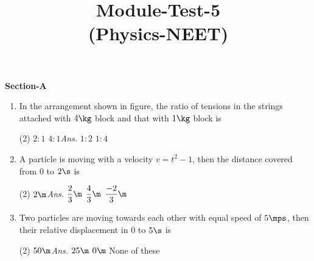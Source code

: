 \documentclass{article}
\title{Module-Test-5\\(Physics-NEET)}
\newcommand{\ans}{\textcolor{red!95}{\textit{\quad Ans.}}}
\begin{document}
\maketitle



\begin{center}
\textbf{Section-A}
\end{center}


\begin{enumerate}

\item In the arrangement shown in figure, the ratio of tensions in the strings attached with $4 \kg$ block and that with $1 \kg$ block is
\begin{center}
\end{center} 
\begin{tasks}(2)
	\task $2:1$
	\task $4:1$\ans
	\task $1:2$
	\task $1:4$
\end{tasks}

	\item A particle is moving with a velocity $v=t^2-1$, then the distance covered from $0$ to $2\s$ is
	\begin{center}
	\end{center}
	\begin{tasks}(2)
		\task $2\m$\ans
		\task $\dfrac{2}{3}\m$
		\task $\dfrac{4}{3}\m$
		\task $\dfrac{-2}{3}\m$
	\end{tasks}
	
	\item Two particles are moving towards each other with equal speed of $5\mps$, then their relative displacement in $0$ to $5\s$ is
	\begin{tasks}(2)
		\task $50\m$\ans
		\task $25\m$
		\task $0\m$
		\task None of these
	\end{tasks}
	

\end{enumerate}
\end{document}
